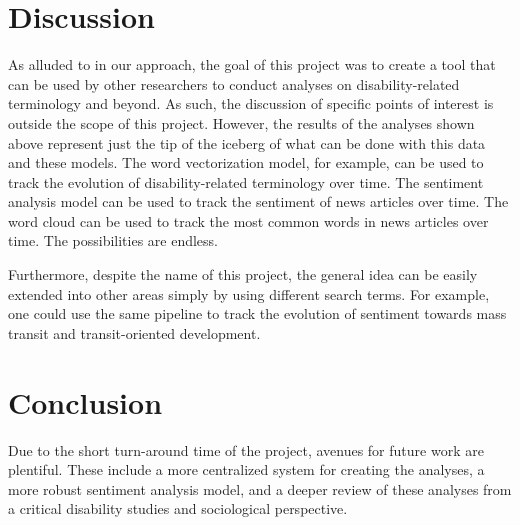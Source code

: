 \documentclass[11pt,a4paper, twocolumn]{article}
\begin{document}
\section{Discussion}
As alluded to in our approach, the goal of this project was to create a tool that can be used by other researchers to conduct analyses on disability-related terminology and beyond. As such, the discussion of specific points of interest is outside the scope of this project. However, the results of the analyses shown above represent just the tip of the iceberg of what can be done with this data and these models. The word vectorization model, for example, can be used to track the evolution of disability-related terminology over time. The sentiment analysis model can be used to track the sentiment of news articles over time. The word cloud can be used to track the most common words in news articles over time. The possibilities are endless.

Furthermore, despite the name of this project, the general idea can be easily extended into other areas simply by using different search terms. For example, one could use the same pipeline to track the evolution of sentiment towards mass transit and transit-oriented development. 

\section{Conclusion}
Due to the short turn-around time of the project, avenues for future work are plentiful. These include a more centralized system for creating the analyses, a more robust sentiment analysis model, and a deeper review of these analyses from a critical disability studies and sociological perspective.



\end{document}
